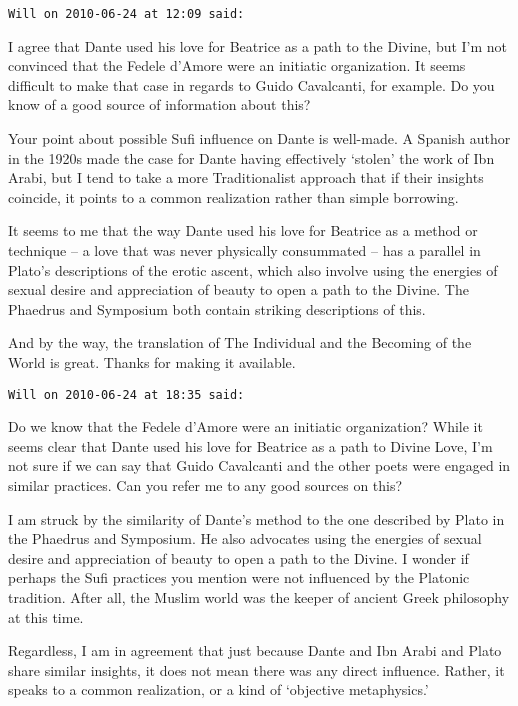 \begin{footnotesize}\begin{sffamily}



\texttt{Will on 2010-06-24 at 12:09 said: }

I agree that Dante used his love for Beatrice as a path to the Divine, but I'm not convinced that the Fedele d'Amore were an initiatic organization. It seems difficult to make that case in regards to Guido Cavalcanti, for example. Do you know of a good source of information about this?

Your point about possible Sufi influence on Dante is well-made. A Spanish author in the 1920s made the case for Dante having effectively `stolen' the work of Ibn Arabi, but I tend to take a more Traditionalist approach that if their insights coincide, it points to a common realization rather than simple borrowing.

It seems to me that the way Dante used his love for Beatrice as a method or technique – a love that was never physically consummated – has a parallel in Plato's descriptions of the erotic ascent, which also involve using the energies of sexual desire and appreciation of beauty to open a path to the Divine. The Phaedrus and Symposium both contain striking descriptions of this.

And by the way, the translation of The Individual and the Becoming of the World is great. Thanks for making it available.


\hfill

\texttt{Will on 2010-06-24 at 18:35 said: }

Do we know that the Fedele d'Amore were an initiatic organization? While it seems clear that Dante used his love for Beatrice as a path to Divine Love, I'm not sure if we can say that Guido Cavalcanti and the other poets were engaged in similar practices. Can you refer me to any good sources on this?

I am struck by the similarity of Dante's method to the one described by Plato in the Phaedrus and Symposium. He also advocates using the energies of sexual desire and appreciation of beauty to open a path to the Divine. I wonder if perhaps the Sufi practices you mention were not influenced by the Platonic tradition. After all, the Muslim world was the keeper of ancient Greek philosophy at this time.

Regardless, I am in agreement that just because Dante and Ibn Arabi and Plato share similar insights, it does not mean there was any direct influence. Rather, it speaks to a common realization, or a kind of `objective metaphysics.'



\end{sffamily}
\end{footnotesize}

